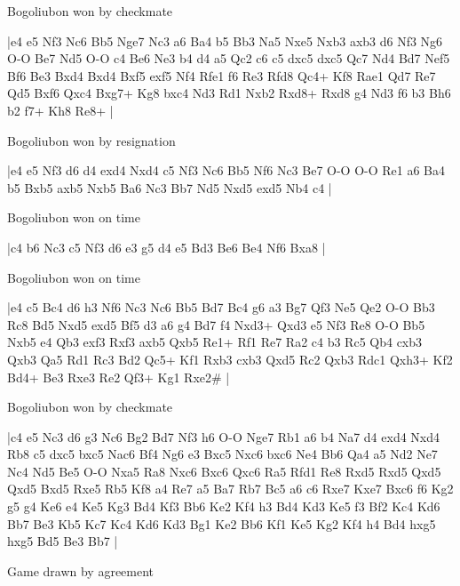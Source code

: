 Bogoliubon won by checkmate

\makegametitle
|e4 e5 Nf3 Nc6 Bb5 Nge7 Nc3 a6 Ba4 b5 Bb3 Na5 Nxe5 Nxb3 axb3 d6 Nf3 Ng6 O-O Be7 Nd5 O-O c4 Be6 Ne3 b4 d4 a5 Qc2 c6 c5 dxc5 dxc5 Qc7 Nd4 Bd7 Nef5 Bf6 Be3 Bxd4 Bxd4 Bxf5 exf5 Nf4 Rfe1 f6 Re3 Rfd8 Qc4+ Kf8 Rae1 Qd7 Re7 Qd5 Bxf6 Qxc4 Bxg7+ Kg8 bxc4 Nd3 Rd1 Nxb2 Rxd8+ Rxd8 g4 Nd3 f6 b3 Bh6 b2 f7+ Kh8 Re8+  |

\showboard

Bogoliubon won by resignation

\makegametitle
|e4 e5 Nf3 d6 d4 exd4 Nxd4 c5 Nf3 Nc6 Bb5 Nf6 Nc3 Be7 O-O O-O Re1 a6 Ba4 b5 Bxb5 axb5 Nxb5 Ba6 Nc3 Bb7 Nd5 Nxd5 exd5 Nb4 c4  |

\showboard

Bogoliubon won on time

\makegametitle
|c4 b6 Nc3 c5 Nf3 d6 e3 g5 d4 e5 Bd3 Be6 Be4 Nf6 Bxa8  |

\showboard

Bogoliubon won on time

\makegametitle
|e4 c5 Bc4 d6 h3 Nf6 Nc3 Nc6 Bb5 Bd7 Bc4 g6 a3 Bg7 Qf3 Ne5 Qe2 O-O Bb3 Rc8 Bd5 Nxd5 exd5 Bf5 d3 a6 g4 Bd7 f4 Nxd3+ Qxd3 e5 Nf3 Re8 O-O Bb5 Nxb5 e4 Qb3 exf3 Rxf3 axb5 Qxb5 Re1+ Rf1 Re7 Ra2 c4 b3 Rc5 Qb4 cxb3 Qxb3 Qa5 Rd1 Rc3 Bd2 Qc5+ Kf1 Rxb3 cxb3 Qxd5 Rc2 Qxb3 Rdc1 Qxh3+ Kf2 Bd4+ Be3 Rxe3 Re2 Qf3+ Kg1 Rxe2\#  |

\showboard

Bogoliubon won by checkmate

\makegametitle
|c4 e5 Nc3 d6 g3 Nc6 Bg2 Bd7 Nf3 h6 O-O Nge7 Rb1 a6 b4 Na7 d4 exd4 Nxd4 Rb8 c5 dxc5 bxc5 Nac6 Bf4 Ng6 e3 Bxc5 Nxc6 bxc6 Ne4 Bb6 Qa4 a5 Nd2 Ne7 Nc4 Nd5 Be5 O-O Nxa5 Ra8 Nxc6 Bxc6 Qxc6 Ra5 Rfd1 Re8 Rxd5 Rxd5 Qxd5 Qxd5 Bxd5 Rxe5 Rb5 Kf8 a4 Re7 a5 Ba7 Rb7 Bc5 a6 c6 Rxe7 Kxe7 Bxc6 f6 Kg2 g5 g4 Ke6 e4 Ke5 Kg3 Bd4 Kf3 Bb6 Ke2 Kf4 h3 Bd4 Kd3 Ke5 f3 Bf2 Kc4 Kd6 Bb7 Be3 Kb5 Kc7 Kc4 Kd6 Kd3 Bg1 Ke2 Bb6 Kf1 Ke5 Kg2 Kf4 h4 Bd4 hxg5 hxg5 Bd5 Be3 Bb7  |

\showboard

Game drawn by agreement

